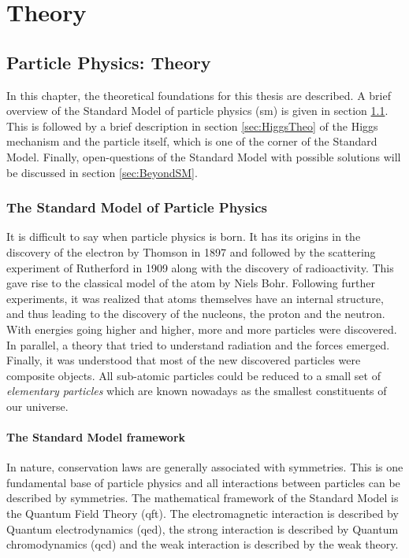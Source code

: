 \part{Theory}

\chapter{Particle Physics: Theory}
\label{chap:Theory}

In this chapter, the theoretical foundations for this thesis are described. A brief overview of the Standard Model of particle physics (\acrshort{sm}) is given in section \ref{sec:SM}. This is followed by a brief description in section \ref{sec:HiggsTheo} of the Higgs mechanism and the particle itself, which is one of the corner of the Standard Model. Finally, open-questions of the Standard Model with possible solutions will be discussed in section \ref{sec:BeyondSM}.

\section{The Standard Model of Particle Physics}
\label{sec:SM}

It is difficult to say when particle physics is born. It has its origins in the discovery of the electron by Thomson \cite{JJThomson:1897} in 1897 and followed by the scattering experiment of Rutherford \cite{Rutherford:1911} in 1909 along with the discovery of radioactivity. This gave rise to the classical model of the atom by Niels Bohr. Following further experiments, it was realized that atoms themselves have an internal structure, and thus leading to the discovery of the nucleons, the proton and the neutron. With energies going higher and higher, more and more particles were discovered. In parallel, a theory that tried to understand radiation and the forces emerged. Finally, it was understood that most of the new discovered particles were composite objects. All sub-atomic particles could be reduced to a small set of \textit{elementary particles} which are known nowadays as the smallest constituents of our universe.

\subsection{The Standard Model framework}

In nature, conservation laws are generally associated with symmetries. This is one fundamental base of particle physics and all interactions between particles can be described by symmetries. The mathematical framework of the Standard Model is the Quantum Field Theory (\acrshort{qft}). The electromagnetic interaction is described by Quantum electrodynamics (\acrshort{qed}), the strong interaction is described by Quantum chromodynamics (\acrshort{qcd}) and the weak interaction is described by the weak theory.

